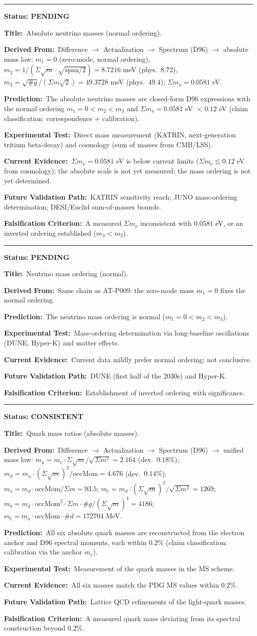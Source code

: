 \documentclass[11pt,a4paper]{article}
\newcommand{\predstart}[2]{%
  \par\medskip\noindent\hrule\par\smallskip
  \noindent{\large\bfseries #1}\hfill{\bfseries Status: #2}\par\smallskip
}
\newcommand{\pfield}[2]{%
  \noindent\textbf{#1:}~#2\par\smallskip
}
\begin{document}
\predstart{AT-P009}{PENDING}
\pfield{Title}{Absolute neutrino masses (normal ordering).}
\pfield{Derived From}{Difference $\to$ Actualization $\to$ Spectrum (D96) $\to$ absolute
mass law: $m_1 = 0$ (zero-mode, normal ordering), $m_2 = 1/(\Sigma\sqrt{m}\cdot\sqrt{
\mathrm{span}/2}) = 8.7216$ meV (phys.\ $8.72$), $m_3 = \sqrt{\#g}/(\Sigma m\sqrt{2}) =
49.3728$ meV (phys.\ $49.4$); $\Sigma m_\nu = 0.0581$ eV.}
\pfield{Prediction}{The absolute neutrino masses are closed-form D96 expressions with the
normal ordering $m_1 = 0 < m_2 < m_3$ and $\Sigma m_\nu = 0.0581$ eV $< 0.12$ eV
(claim classification: correspondence + calibration).}
\pfield{Experimental Test}{Direct mass measurement (KATRIN, next-generation tritium
beta-decay) and cosmology (sum of masses from CMB/LSS).}
\pfield{Current Evidence}{$\Sigma m_\nu = 0.0581$ eV is below current limits
($\Sigma m_\nu \lesssim 0.12$ eV from cosmology); the absolute scale is not yet measured;
the mass ordering is not yet determined.}
\pfield{Future Validation Path}{KATRIN sensitivity reach; JUNO mass-ordering determination;
DESI/Euclid sum-of-masses bounds.}
\pfield{Falsification Criterion}{A measured $\Sigma m_\nu$ inconsistent with $0.0581$ eV, or
an inverted ordering established ($m_3 < m_2$).}

\predstart{AT-P010}{PENDING}
\pfield{Title}{Neutrino mass ordering (normal).}
\pfield{Derived From}{Same chain as AT-P009: the zero-mode mass $m_1 = 0$ fixes the normal
ordering.}
\pfield{Prediction}{The neutrino mass ordering is normal ($m_1 = 0 < m_2 < m_3$).}
\pfield{Experimental Test}{Mass-ordering determination via long-baseline oscillations
(DUNE, Hyper-K) and matter effects.}
\pfield{Current Evidence}{Current data mildly prefer normal ordering; not conclusive.}
\pfield{Future Validation Path}{DUNE (first half of the 2030s) and Hyper-K.}
\pfield{Falsification Criterion}{Establishment of inverted ordering with significance.}

\predstart{AT-P011}{CONSISTENT}
\pfield{Title}{Quark mass ratios (absolute masses).}
\pfield{Derived From}{Difference $\to$ Actualization $\to$ Spectrum (D96) $\to$ unified
mass law: $m_u = m_e\cdot\Sigma\sqrt{m}/\sqrt{\Sigma m^2} = 2.164$ (dev.\ $0.18\%$);
$m_d = m_u\cdot(\Sigma\sqrt{m})^2/\mathrm{occMom} = 4.676$ (dev.\ $0.14\%$);
$m_s = m_d\cdot\mathrm{occMom}/\Sigma m = 93.5$; $m_c = m_d\cdot(\Sigma\sqrt{m})^2/
\sqrt{\Sigma m^2} = 1269$; $m_b = m_d\cdot\mathrm{occMom}^2\cdot\Sigma m\cdot\#g/
(\Sigma\sqrt{m})^4 = 4186$; $m_t = m_u\cdot\mathrm{occMom}\cdot\#d = 172704$ MeV.}
\pfield{Prediction}{All six absolute quark masses are reconstructed from the electron anchor
and D96 spectral moments, each within $0.2\%$ (claim classification: calibration via the
anchor $m_e$).}
\pfield{Experimental Test}{Measurement of the quark masses in the $\overline{\mathrm{MS}}$
scheme.}
\pfield{Current Evidence}{All six masses match the PDG $\overline{\mathrm{MS}}$ values
within $0.2\%$.}
\pfield{Future Validation Path}{Lattice QCD refinements of the light-quark masses.}
\pfield{Falsification Criterion}{A measured quark mass deviating from its spectral
construction beyond $0.2\%$.}
\end{document}

